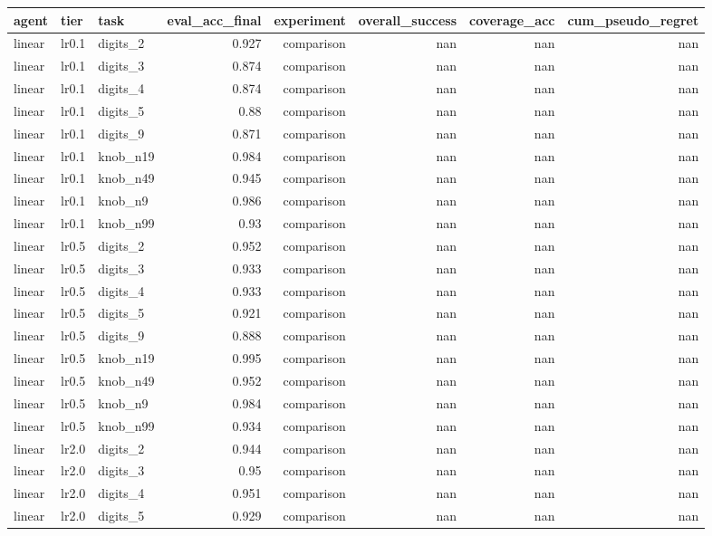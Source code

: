 \begin{table}[t]
\centering
\small
\begin{tabular}{lllrrrrr}
\toprule
agent & tier & task & eval\_acc\_final & experiment & overall\_success & coverage\_acc & cum\_pseudo\_regret \\
\midrule
linear & lr0.1 & digits\_2 & 0.927 & comparison & nan & nan & nan \\
linear & lr0.1 & digits\_3 & 0.874 & comparison & nan & nan & nan \\
linear & lr0.1 & digits\_4 & 0.874 & comparison & nan & nan & nan \\
linear & lr0.1 & digits\_5 & 0.88 & comparison & nan & nan & nan \\
linear & lr0.1 & digits\_9 & 0.871 & comparison & nan & nan & nan \\
linear & lr0.1 & knob\_n19 & 0.984 & comparison & nan & nan & nan \\
linear & lr0.1 & knob\_n49 & 0.945 & comparison & nan & nan & nan \\
linear & lr0.1 & knob\_n9 & 0.986 & comparison & nan & nan & nan \\
linear & lr0.1 & knob\_n99 & 0.93 & comparison & nan & nan & nan \\
linear & lr0.5 & digits\_2 & 0.952 & comparison & nan & nan & nan \\
linear & lr0.5 & digits\_3 & 0.933 & comparison & nan & nan & nan \\
linear & lr0.5 & digits\_4 & 0.933 & comparison & nan & nan & nan \\
linear & lr0.5 & digits\_5 & 0.921 & comparison & nan & nan & nan \\
linear & lr0.5 & digits\_9 & 0.888 & comparison & nan & nan & nan \\
linear & lr0.5 & knob\_n19 & 0.995 & comparison & nan & nan & nan \\
linear & lr0.5 & knob\_n49 & 0.952 & comparison & nan & nan & nan \\
linear & lr0.5 & knob\_n9 & 0.984 & comparison & nan & nan & nan \\
linear & lr0.5 & knob\_n99 & 0.934 & comparison & nan & nan & nan \\
linear & lr2.0 & digits\_2 & 0.944 & comparison & nan & nan & nan \\
linear & lr2.0 & digits\_3 & 0.95 & comparison & nan & nan & nan \\
linear & lr2.0 & digits\_4 & 0.951 & comparison & nan & nan & nan \\
linear & lr2.0 & digits\_5 & 0.929 & comparison & nan & nan & nan \\

\end{tabular}
\end{table}
